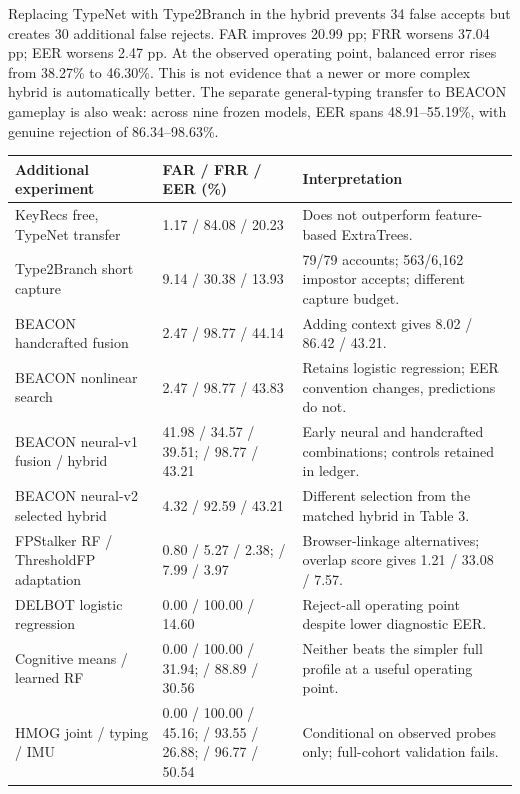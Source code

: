\documentclass[10pt,a4paper]{article}
\newcommand{\smalltable}{\fontsize{8.5}{10.4}\selectfont}
\begin{document}
Replacing TypeNet with Type2Branch in the hybrid prevents 34 false accepts but creates 30 additional false rejects. FAR improves 20.99 pp; FRR worsens 37.04 pp; EER worsens 2.47 pp. At the observed operating point, balanced error rises from 38.27\% to 46.30\%. This is not evidence that a newer or more complex hybrid is automatically better. The separate general-typing transfer to BEACON gameplay is also weak: across nine frozen models, EER spans 48.91--55.19\%, with genuine rejection of 86.34--98.63\%.

\begin{center}\smalltable
\begin{tabularx}{\linewidth}{@{}p{48mm}p{37mm}X@{}}
\toprule
\textbf{Additional experiment} & \textbf{FAR / FRR / EER (\%)} & \textbf{Interpretation}\\\midrule
KeyRecs free, TypeNet transfer & 1.17 / 84.08 / 20.23 & Does not outperform feature-based ExtraTrees.\\
Type2Branch short capture & 9.14 / 30.38 / 13.93 & 79/79 accounts; 563/6,162 impostor accepts; different capture budget.\\
BEACON handcrafted fusion & 2.47 / 98.77 / 44.14 & Adding context gives 8.02 / 86.42 / 43.21.\\
BEACON nonlinear search & 2.47 / 98.77 / 43.83 & Retains logistic regression; EER convention changes, predictions do not.\\
BEACON neural-v1 fusion / hybrid & 41.98 / 34.57 / 39.51;\newline 2.47 / 98.77 / 43.21 & Early neural and handcrafted combinations; controls retained in ledger.\\
BEACON neural-v2 selected hybrid & 4.32 / 92.59 / 43.21 & Different selection from the matched hybrid in Table 3.\\
FPStalker RF / ThresholdFP adaptation & 0.80 / 5.27 / 2.38;\newline 1.12 / 7.99 / 3.97 & Browser-linkage alternatives; overlap score gives 1.21 / 33.08 / 7.57.\\
DELBOT logistic regression & 0.00 / 100.00 / 14.60 & Reject-all operating point despite lower diagnostic EER.\\
Cognitive means / learned RF & 0.00 / 100.00 / 31.94;\newline 4.17 / 88.89 / 30.56 & Neither beats the simpler full profile at a useful operating point.\\
HMOG joint / typing / IMU & 0.00 / 100.00 / 45.16;\newline 0.00 / 93.55 / 26.88;\newline 4.30 / 96.77 / 50.54 & Conditional on observed probes only; full-cohort validation fails.\\\bottomrule
\end{tabularx}
\end{center}
\end{document}
